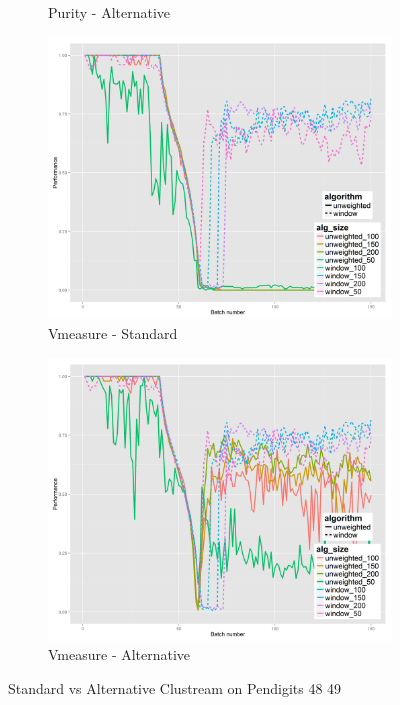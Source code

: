 \begin{figure}[!h]
\begin{subfigure}[b]{0.47\textwidth}
                \caption{Purity - Alternative}
                \label{fig:pa_4849}
        \end{subfigure}
        \begin{subfigure}[b]{0.47\textwidth}
          \includegraphics[width=\textwidth]{standard_alt/ci_evolving_pen_48_49_standard_vmeasure.png}
                 \caption{Vmeasure - Standard}
                 \label{fig:vs_4849}
        \end{subfigure}
        \begin{subfigure}[b]{0.47\textwidth}
                 \includegraphics[width=\textwidth]{standard_alt/ci_evolving_pen_48_49_alternative_vmeasure.png}
                \caption{Vmeasure - Alternative}
                \label{fig:va_4849}
        \end{subfigure}
\caption{Standard vs Alternative Clustream on Pendigits 48 49}
\label{fig:standard_alternative_4849}
\end{figure}


